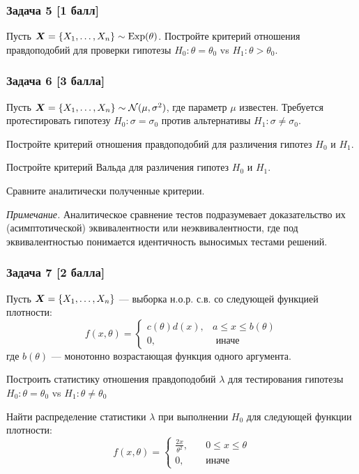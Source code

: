 \documentclass{article}
\renewenvironment{itemize}[1]{\begin{compactitem}#1}{\end{compactitem}}
\renewenvironment{enumerate}[1]{\begin{compactenum}#1}{\end{compactenum}}
\begin{document}
\subsubsection*{Задача 5 [1 балл]}
Пусть $\boldsymbol{X} = \{X_1,\dots,X_n\} \sim \mathrm{Exp}(\theta)$. Постройте критерий отношения правдоподобий для проверки гипотезы $H_0: \theta = \theta_0$ vs $H_1 : \theta > \theta_0$.

\subsubsection*{Задача 6 [3 балла]}
Пусть $\boldsymbol{X} = \{X_1,\ldots,X_n\} \sim \mathcal{N}(\mu,\sigma^2)$, где параметр $\mu$ известен. Требуется протестировать гипотезу $H_0\colon \sigma = \sigma_0$ против альтернативы $H_1 \colon \sigma \neq \sigma_0$.
\begin{itemize}
	\item Постройте критерий отношения правдоподобий для различения гипотез $H_0$ и $H_1$.
	\item Постройте критерий Вальда для различения гипотез $H_0$ и $H_1$.
	\item Сравните аналитически полученные критерии.
\end{itemize}

\textit{Примечание.} Аналитическое сравнение тестов подразумевает доказательство их (асимптотической) эквивалентности или неэквивалентности, где под эквивалентностью понимается идентичность выносимых тестами решений.


\subsubsection*{Задача 7 [2 балла]}
Пусть $\boldsymbol{X} = \{X_1,\dots,X_n\}$ --- выборка н.о.р. с.в. со следующей функцией плотности:
$$
f(x, \theta) = \begin{cases}
	c(\theta)d(x), &a \leqslant x \leqslant b(\theta) \\
	0, &\text{ иначе }
\end{cases}
$$
где $b(\theta)$ --- монотонно возрастающая функция одного аргумента.

\begin{enumerate}
	\item[(a)] Построить статистику отношения правдоподобий $\lambda$ для тестирования гипотезы $H_0: \theta = \theta_0$ vs $H_1: \theta \neq \theta_0$
	\item[(b)] Найти распределение статистики $\lambda$ при выполнении $H_0$ для следующей функции плотности:
	$$
	f(x, \theta) = \begin{cases}
		\frac{2x}{\theta^2}, \quad &0 \leqslant x \leqslant \theta \\
		0, \quad &\text{иначе}
	\end{cases}
	$$
\end{enumerate}
\end{document}
